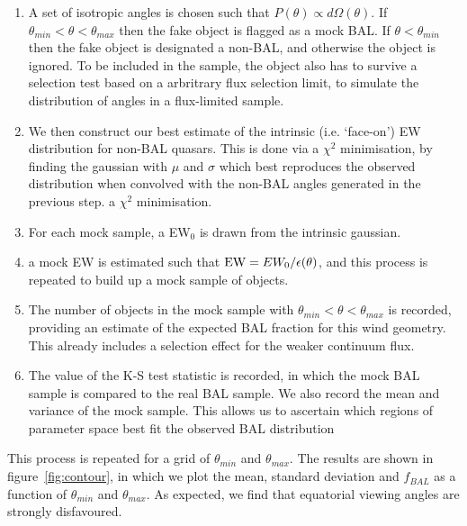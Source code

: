 \begin{enumerate}
	\setlength\itemsep{1em}
	\item A set of isotropic angles is chosen such that $P(\theta)\propto d\Omega(\theta)$.
	If $\theta_{min}<\theta<\theta_{max}$ then the fake object is flagged as a mock BAL. 
	If $\theta<\theta_{min}$ then the fake object is designated a non-BAL, and otherwise
	the object is ignored. To be included in the sample, the object also has to 
	survive a selection test based on a arbritrary flux selection limit, to simulate the
	distribution of angles in a flux-limited sample.
	\item We then construct our best estimate of the intrinsic (i.e. `face-on')
	EW distribution for non-BAL quasars. This is done via a $\chi^2$ minimisation,
	by finding the gaussian with $\mu$ and $\sigma$ which best 
	reproduces the observed distribution when convolved with
	the non-BAL angles generated in the previous step. 
	a $\chi^2$ minimisation.
	\item For each mock sample, a EW$_0$ is drawn from the intrinsic gaussian.
	\item a mock EW is estimated such that ${\rm EW} = EW_0 / \epsilon(\theta)$,
	and this process is repeated to build up a mock sample of objects.
	\item The number of objects in the mock sample with 
	$\theta_{min}<\theta<\theta_{max}$ is recorded, providing an 
	estimate of the expected BAL fraction for this wind geometry. 
	This already includes a selection effect for the weaker continuum flux.
	\item The value of the K-S test statistic is recorded, in which the 
	mock BAL sample is compared to the real BAL sample. We also record the 
	mean and variance of the mock sample. This allows us to ascertain which regions
	of parameter space best fit the observed BAL distribution
\end{enumerate}

This process is repeated for a grid of $\theta_{min}$ and $\theta_{max}$. The 
results are shown in figure~\ref{fig:contour}, in which we plot the mean, standard deviation 
and $f_{BAL}$ as a function of $\theta_{min}$ and $\theta_{max}$. As expected,
we find that equatorial viewing angles are strongly disfavoured. 




